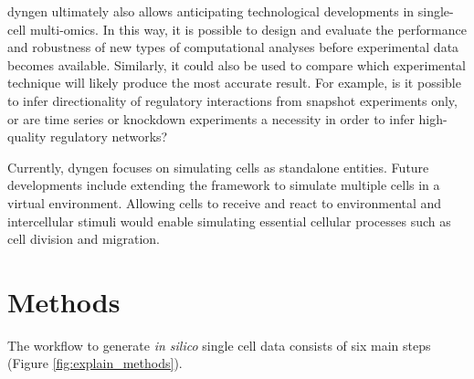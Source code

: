 dyngen ultimately also allows anticipating technological developments in single-cell multi-omics. In this way, it is possible to design and evaluate the performance and robustness of new types of computational analyses before experimental data becomes available.
Similarly, it could also be used to compare which experimental technique will likely produce the most accurate result. For example, is it possible to infer directionality of regulatory interactions from snapshot experiments only, or are time series or knockdown experiments a necessity in order to infer high-quality regulatory networks?

Currently, dyngen focuses on simulating cells as standalone entities.
Future developments include extending the framework to simulate multiple cells in a virtual environment. Allowing cells to receive and react to environmental and intercellular stimuli would enable simulating essential cellular processes such as cell division and migration. 

\section{Methods}

The workflow to generate \textit{in silico} single cell data consists of six main steps (Figure \ref{fig:explain_methods}). 

